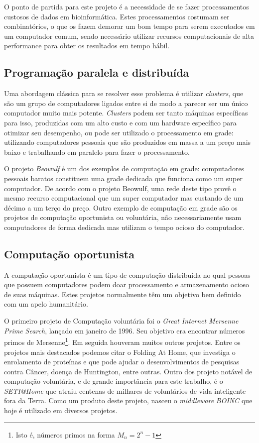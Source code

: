 
O ponto de partida para este projeto é a necessidade de se fazer processamentos custosos de 
dados em bioinformática. Estes processamentos costumam ser combinatórios, o que os fazem
demorar um bom tempo para serem executados em um computador comum, sendo necessário utilizar recursos
computacionais de alta performance para obter os resultados em tempo hábil.

\subsection{Programação paralela e distribuída}

Uma abordagem clássica para se resolver esse problema é utilizar \textit{clusters}, que são um grupo de computadores
ligados entre si de modo a parecer ser um único computador muito mais potente. \textit{Clusters} podem ser tanto máquinas
específicas para isso, produzidas com um alto custo e com um hardware específico para otimizar seu desempenho, ou 
pode ser utilizado o processamento em grade: utilizando computadores pessoais que são produzidos em massa a um preço mais baixo e 
trabalhando em paralelo para fazer o processamento. 

O projeto \emph{Beowulf} é um dos exemplos de computação em grade: computadores pessoais baratos constituem uma grade dedicada 
que funciona como um super computador. De acordo com o projeto Beowulf, uma rede deste tipo provê o mesmo recurso computacional 
que um super computador mas custando de um décimo a um terço do preço. Outro exemplo de computação em grade são os 
projetos de computação oportunista ou voluntária, 
não necessariamente usam computadores de forma dedicada mas utilizam o tempo ocioso do computador.

\subsection{Computação oportunista}

A computação oportunista é um tipo de computação distribuída no qual pessoas que possuem computadores podem doar processamento e
armazenamento ocioso de suas máquinas. Estes projetos normalmente têm um objetivo bem definido com um apelo humanitário.

O primeiro projeto de Computação voluntária foi o \textit{Great Internet Mersenne Prime Search}, lançado em janeiro de 1996. 
Seu objetivo era encontrar números primos de Mersenne\footnote{Isto é, números primos na forma $M_n = 2^n - 1$}. Em seguida houveram 
muitos outros projetos. Entre os projetos mais destacados podemos citar 
o Folding At Home, que investiga o enrolamento de proteínas e que pode ajudar o desenvolvimentos de pesquisas contra 
Câncer, doença de Huntington, entre outras. Outro dos projeto notável de computação voluntária, e de grande importância 
para este trabalho, é o \textit{SETI@Home} que atraiu centenas de milhares de voluntários 
de vida inteligente fora da Terra. Como um produto deste projeto, nasceu o \emph{middleware} 
\emph{BOINC} que hoje é utilizado em diversos projetos. 

